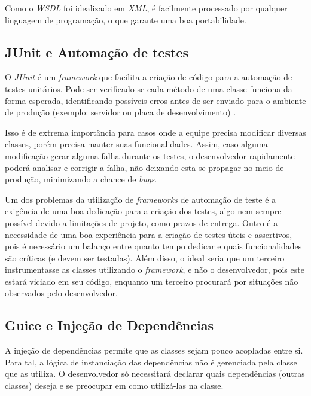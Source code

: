       Como o \textit{\ac{WSDL}} foi idealizado em \textit{\ac{XML}}, é facilmente processado por qualquer linguagem de programação, o que garante uma boa portabilidade.

    \subsection{JUnit e Automação de testes}
    \label{methodology:tools:junit}

      O \textit{JUnit} é um \textit{framework} que facilita a criação de código para a automação de testes unitários. Pode ser verificado se cada método de uma classe funciona da forma esperada, identificando possíveis erros antes de ser enviado para o ambiente de produção (exemplo: servidor ou placa de desenvolvimento) \cite{developer-junit}.

      Isso é de extrema importância para casos onde a equipe precisa modificar diversas classes, porém precisa manter suas funcionalidades. Assim, caso alguma modificação gerar alguma falha durante os testes, o desenvolvedor rapidamente poderá analisar e corrigir a falha, não deixando esta se propagar no meio de produção, minimizando a chance de \textit{bugs}.

      Um dos problemas da utilização de \textit{frameworks} de automação de teste é a exigência de uma boa dedicação para a criação dos testes, algo nem sempre possível devido a limitações de projeto, como prazos de entrega. Outro é a necessidade de uma boa experiência para a criação de testes úteis e assertivos, pois é necessário um balanço entre quanto tempo dedicar e quais funcionalidades são críticas (e devem ser testadas). Além disso, o ideal seria que um terceiro instrumentasse as classes utilizando o \textit{framework}, e não o desenvolvedor, pois este estará viciado em seu código, enquanto um terceiro procurará por situações não observados pelo desenvolvedor.

    \subsection{Guice e Injeção de Dependências}
    \label{methodology:tools:guice}

      A injeção de dependências permite que as classes sejam pouco acopladas entre si. Para tal, a lógica de instanciação das dependências não é gerenciada pela classe que as utiliza. O desenvolvedor só necessitará declarar quais dependências (outras classes) deseja e se preocupar em como utilizá-las na classe.

